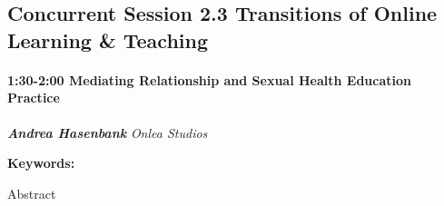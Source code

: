 \documentclass[
]{book}
\begin{document}
\hypertarget{concurrent-session-2.3-transitions-of-online-learning-teaching}{%
\subsection*{Concurrent Session 2.3 \textbar{} Transitions of Online Learning \& Teaching}\label{concurrent-session-2.3-transitions-of-online-learning-teaching}}

\begin{session}
\hypertarget{mediating-relationship-and-sexual-health-education-practice}{%
\paragraph*{\texorpdfstring{1:30-2:00 \textbar{} \textbf{Mediating
Relationship and Sexual Health Education} \textbar{}
Practice}{1:30-2:00 \textbar{} Mediating Relationship and Sexual Health Education \textbar{} Practice}}\label{mediating-relationship-and-sexual-health-education-practice}}

\textbf{\emph{Andrea Hasenbank}} \textbar{} \emph{Onlea Studios}

\textbf{Keywords:}

Abstract
\end{session}
\end{document}
